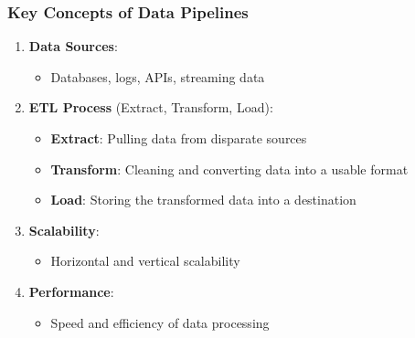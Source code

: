\documentclass[aspectratio=169]{beamer}
\begin{document}
\begin{frame}
    \frametitle{Key Concepts of Data Pipelines}
    \begin{enumerate}
        \item \textbf{Data Sources}:
            \begin{itemize}
                \item Databases, logs, APIs, streaming data
            \end{itemize}
        \item \textbf{ETL Process} (Extract, Transform, Load):
            \begin{itemize}
                \item \textbf{Extract}: Pulling data from disparate sources
                \item \textbf{Transform}: Cleaning and converting data into a usable format
                \item \textbf{Load}: Storing the transformed data into a destination
            \end{itemize}
        \item \textbf{Scalability}:
            \begin{itemize}
                \item Horizontal and vertical scalability
            \end{itemize}
        \item \textbf{Performance}:
            \begin{itemize}
                \item Speed and efficiency of data processing
            \end{itemize}
    \end{enumerate}
\end{frame}
\end{document}
